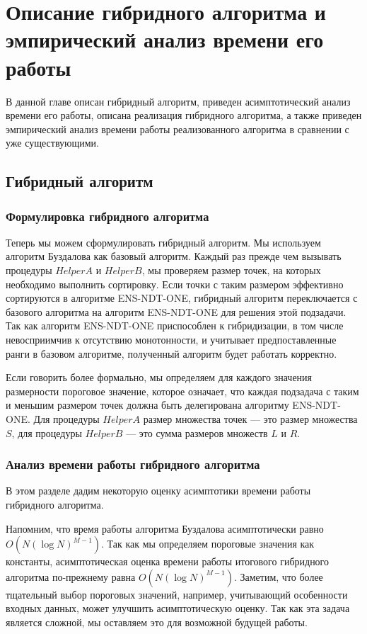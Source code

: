 \chapter{Описание гибридного алгоритма и эмпирический анализ времени его работы}
\label{chapter4}

В данной главе описан гибридный алгоритм, приведен асимптотический анализ времени его работы, описана реализация гибридного алгоритма, а также приведен эмпирический анализ времени работы реализованного алгоритма в сравнении с уже существующими.

\section{Гибридный алгоритм}

\subsection{Формулировка гибридного алгоритма}

Теперь мы можем сформулировать гибридный алгоритм. Мы используем алгоритм Буздалова как базовый алгоритм. Каждый раз прежде чем вызывать процедуры $HelperA$ и $HelperB$, мы проверяем размер точек, на которых необходимо выполнить сортировку. Если точки с таким размером эффективно сортируются в алгоритме ENS-NDT-ONE, гибридный алгоритм переключается с базового алгоритма на алгоритм ENS-NDT-ONE для решения этой подзадачи. Так как алгоритм ENS-NDT-ONE приспособлен к гибридизации, в том числе невосприимчив к отсутствию монотонности, и учитывает предпоставленные ранги в базовом алгоритме, полученный алгоритм будет работать корректно.

Если говорить более формально, мы определяем для каждого значения размерности пороговое значение, которое означает, что каждая подзадача с таким и меньшим размером точек должна быть делегирована алгоритму ENS-NDT-ONE. Для процедуры $HelperA$ размер множества точек {---} это размер множества $S$, для процедуры $HelperB$ {---} это сумма размеров множеств $L$ и $R$.

\subsection{Анализ времени работы гибридного алгоритма}

В этом разделе дадим некоторую оценку асимптотики времени работы гибридного алгоритма.

Напомним, что время работы алгоритма Буздалова асимптотически равно $O(N(\log N)^{M-1})$. Так как мы определяем пороговые значения как константы, асимптотическая оценка времени работы итогового гибридного  алгоритма по-прежнему равна $O(N(\log N)^{M-1})$. Заметим, что более тщательный выбор пороговых значений, например, учитывающий особенности входных данных, может улучшить асимптотическую оценку. Так как эта задача является сложной, мы оставляем это для возможной будущей работы.

